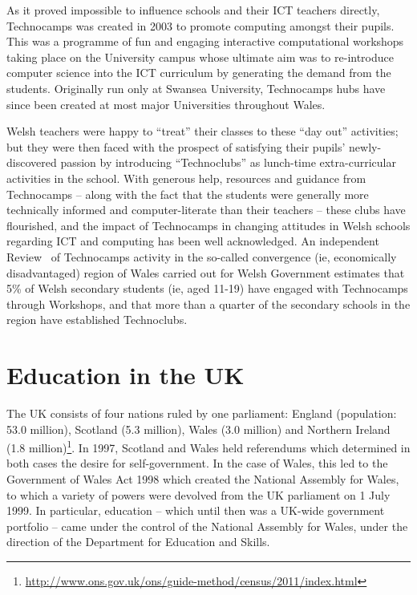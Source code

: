 \documentclass{sig-alternate}
\begin{document}
As it proved impossible to influence schools and their ICT teachers directly,
Technocamps was created in 2003 to promote computing amongst their pupils.
This was a programme of fun and engaging interactive computational workshops
taking place on the University campus
whose ultimate aim was to re-introduce computer science into
the ICT curriculum by generating the demand from the students.
Originally run only at Swansea University,
Technocamps hubs have since been created at most major Universities
throughout Wales.

Welsh teachers were happy to ``treat'' their classes
to these ``day out'' activities; but they were then faced with
the prospect of satisfying their pupils' newly-discovered passion
by introducing ``Technoclubs'' as lunch-time
extra-curricular activities in the school.
With generous help, resources and guidance from Technocamps
-- along with the fact that the students were generally
more technically informed and computer-literate than their teachers -- 
these clubs have flourished, and the impact of Technocamps
in changing attitudes in Welsh schools regarding ICT and computing
has been well acknowledged.
An independent Review~\cite{Wavehill:2015}
of Technocamps activity in the so-called convergence
(ie, economically disadvantaged) region of Wales
carried out for Welsh Government estimates that
5\% of Welsh secondary students (ie, aged 11-19)
have engaged with Technocamps through Workshops,
and that more than a quarter of the secondary schools
in the region have established Technoclubs.

\section{Education in the UK}\label{sec:schools}

The UK consists of four nations ruled by one parliament:
England (population: 53.0 million), Scotland (5.3 million),
Wales (3.0 million) and Northern Ireland (1.8
million)\footnote{\url{http://www.ons.gov.uk/ons/guide-method/census/2011/index.html}}.
In 1997, Scotland and Wales held referendums which
determined in both cases the desire for self-government.
In the case of Wales, this led to the Government of Wales Act 1998
which created the National Assembly for Wales, to which
a variety of powers were devolved from the UK parliament
on 1 July 1999.
In particular, education
-- which until then was a UK-wide government portfolio --
came under the control of the National Assembly for Wales,
under the direction of the Department for Education and Skills.
\end{document}
